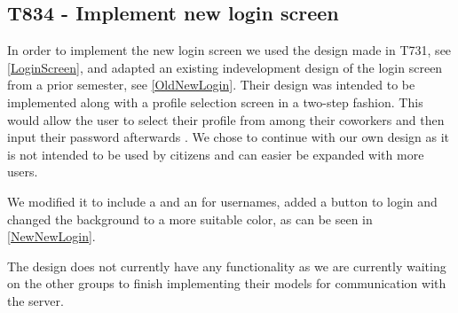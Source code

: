 \subsection{T834 - Implement new login screen}
In order to implement the new login screen we used the design made in T731,
see \autoref{LoginScreen}, and adapted an existing indevelopment design of
the login screen from a prior semester, see \autoref{OldNewLogin}. Their design
was intended to be implemented along with a profile selection screen in
a two-step fashion. This would allow the user to select their profile from
among their coworkers and then input their password afterwards \citep[Ch.9.5,
p.68-70]{RestLogin}. We chose to continue with our own design as it is
not intended to be used by citizens and can easier be expanded with more users.


We modified it to include a  and an  for
usernames, added a button to login and changed the background to a more suitable
color, as can be seen in \autoref{NewNewLogin}.


The design does not currently have any functionality as we are currently waiting
on the other groups to finish implementing their models for communication with
the server.

